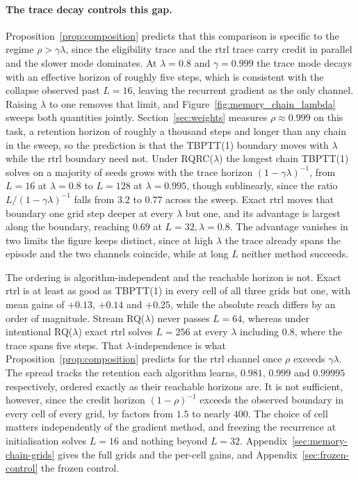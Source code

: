 \documentclass{article}
\begin{document}
\paragraph{The trace decay controls this gap.}
Proposition~\ref{prop:composition} predicts that this comparison is specific to the regime
$\rho > \gamma\lambda$, since the eligibility trace and the \gls{rtrl} trace carry credit in
parallel and the slower mode dominates. At $\lambda{=}0.8$ and $\gamma{=}0.999$ the trace mode
decays with an effective horizon of roughly five steps, which is consistent with the collapse
observed past $L{=}16$, leaving the recurrent gradient as the only channel. Raising $\lambda$ to
one removes that limit, and Figure~\ref{fig:memory_chain_lambda} sweeps both quantities jointly.
Section~\ref{sec:weights} measures
$\rho \approx 0.999$ on this task, a retention horizon of roughly a thousand steps and longer
than any chain in the sweep, so the prediction is that the TBPTT(1) boundary moves with
$\lambda$ while the \gls{rtrl} boundary need not.
Under RQRC($\lambda$) the longest chain TBPTT(1) solves on a majority of seeds grows with the
trace horizon $(1-\gamma\lambda)^{-1}$, from $L{=}16$ at $\lambda{=}0.8$ to $L{=}128$ at
$\lambda{=}0.995$, though sublinearly, since the ratio $L/(1-\gamma\lambda)^{-1}$ falls from
$3.2$ to $0.77$ across the sweep. Exact \gls{rtrl} moves that boundary one grid step deeper at every
$\lambda$ but one, and its advantage is largest along the boundary, reaching $0.69$ at
$L{=}32,\lambda{=}0.8$. The advantage vanishes in two limits the figure keeps distinct, since at high
$\lambda$ the trace already spans the episode and the two channels coincide, while at long $L$
neither method succeeds.

The ordering is algorithm-independent and the reachable horizon is not. Exact \gls{rtrl} is at
least as good as TBPTT(1) in every cell of all three grids but one, with mean gains of $+0.13$,
$+0.14$ and $+0.25$, while the absolute reach differs by an order of magnitude. Stream
RQ($\lambda$) never passes $L{=}64$, whereas under intentional RQ($\lambda$) exact \gls{rtrl}
solves $L{=}256$ at every $\lambda$ including $0.8$, where the trace spans five steps. That
$\lambda$-independence is what Proposition~\ref{prop:composition} predicts for the \gls{rtrl}
channel once $\rho$ exceeds $\gamma\lambda$. The spread tracks the retention each algorithm
learns, $0.981$, $0.999$ and $0.99995$ respectively, ordered exactly as their reachable horizons
are. It is not
sufficient, however, since the credit horizon $(1-\rho)^{-1}$ exceeds the observed boundary in every
cell of every grid, by factors from $1.5$ to nearly $400$. The choice of cell matters
independently of the gradient method, and freezing the recurrence at initialisation solves
$L{=}16$ and nothing beyond $L{=}32$. Appendix~\ref{sec:memory-chain-grids} gives the full
grids and the per-cell gains, and Appendix~\ref{sec:frozen-control} the frozen control.
\end{document}
